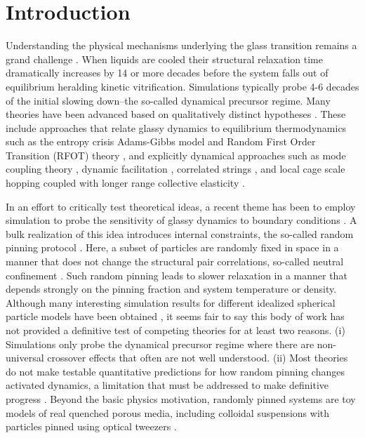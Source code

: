 \documentclass[twocolumn,showpacs,preprintnumbers,amsmath,amssymb,unsortedaddress,
]{revtex4-1}
\begin{document}
\maketitle


\section{Introduction}
Understanding the physical mechanisms underlying the glass transition remains a grand challenge \cite{1,2,3}. When liquids are cooled their structural relaxation time dramatically increases by 14 or more decades before the system falls out of equilibrium heralding kinetic vitrification. Simulations typically probe 4-6 decades of the initial slowing down--the so-called dynamical precursor regime. Many theories have been advanced based on qualitatively distinct hypotheses \cite{1,2,3,4,5,6,7,8,9,10,11,12,13,14,15,16,17,18,19}. These include approaches that relate glassy dynamics to equilibrium thermodynamics such as the entropy crisis Adams-Gibbs model \cite{3,4} and Random First Order Transition (RFOT) theory \cite{13,14}, and explicitly dynamical approaches such as mode coupling theory \cite{18}, dynamic facilitation \cite{15,16}, correlated strings \cite{19}, and local cage scale hopping \cite{9,10} coupled with longer range collective elasticity \cite{7,8,11}. 

In an effort to critically test theoretical ideas, a recent theme has been to employ simulation to probe the sensitivity of glassy dynamics to boundary conditions \cite{3,20}.  A bulk realization of this idea introduces internal constraints, the so-called random pinning protocol \cite{21}. Here, a subset of particles are randomly fixed in space in a manner that does not change the structural pair correlations, so-called neutral confinement \cite{21,22,23,24,25,26,27,28}. Such random pinning leads to slower relaxation in a manner that depends strongly on the pinning fraction and system temperature or density. Although many interesting simulation results for different idealized spherical particle models have been obtained \cite{22,23,24,25,26,27,28}, it seems fair to say this body of work has not provided a definitive test of competing theories for at least two reasons. (i) Simulations only probe the dynamical precursor regime where there are non-universal crossover effects that often are not well understood. (ii) Most theories do not make testable quantitative predictions for how random pinning changes activated dynamics, a limitation that must be addressed to make definitive progress \cite{25}. Beyond the basic physics motivation, randomly pinned systems are toy models of real quenched porous media, including colloidal suspensions with particles pinned using optical tweezers \cite{29}. 
\end{document}
